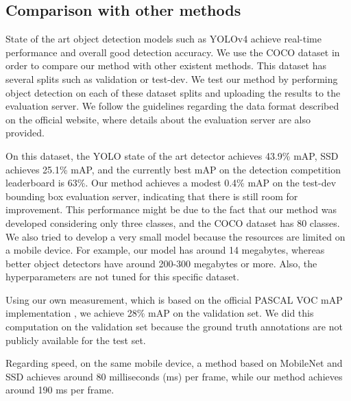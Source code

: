 \subsection{Comparison with other methods}
    State of the art object detection models such as YOLOv4 \cite{yolov4} achieve real-time performance and overall good detection accuracy. We use the COCO dataset \cite{coco} in order to compare our method with other existent methods. This dataset has several splits such as validation or test-dev. We test our method by performing object detection on each of these dataset splits and uploading the results to the evaluation server. We follow the guidelines regarding the data format described on the official website, where details about the evaluation server are also provided. 
    
    On this dataset, the YOLO state of the art detector achieves 43.9\% mAP, SSD achieves 25.1\% mAP, and the currently best mAP on the detection competition leaderboard is 63\%. Our method achieves a modest 0.4\% mAP on the test-dev bounding box evaluation server, indicating that there is still room for improvement. This performance might be due to the fact that our method was developed considering only three classes, and the COCO dataset has 80 classes. We also tried to develop a very small model because the resources are limited on a mobile device. For example, our model has around 14 megabytes, whereas better object detectors have around 200-300 megabytes or more. Also, the hyperparameters are not tuned for this specific dataset.
    
    Using our own measurement, which is based on the official PASCAL VOC mAP implementation \cite{pascal-voc-2007}, we achieve 28\% mAP on the validation set. We did this computation on the validation set because the ground truth annotations are not publicly available for the test set.
  
    Regarding speed, on the same mobile device, a method based on MobileNet \cite{mobilenetv2} and SSD \cite{ssd} achieves around 80 milliseconds (ms) per frame, while our method achieves around 190 ms per frame.
